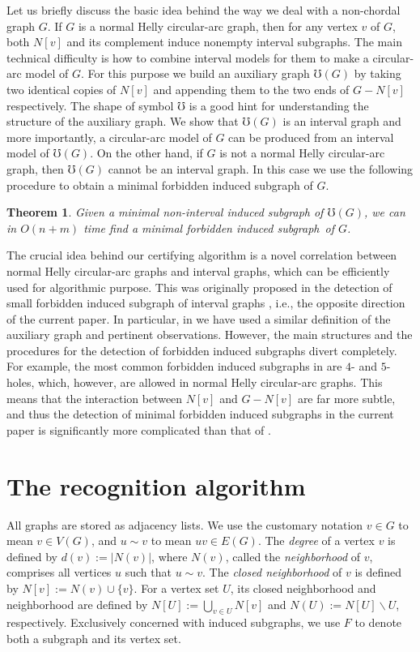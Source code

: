 \documentclass[10pt]{article}
\newtheorem{theorem}{Theorem}[section]
\newcommand{\badgraph}{minimal forbidden induced subgraph}
\newcommand{\nhcag}{normal Helly circular-arc graph}
\begin{document}
Let us briefly discuss the basic idea behind the way we deal with a
non-chordal graph $G$.  If $G$ is a \nhcag, then for any vertex $v$ of
$G$, both $N[v]$ and its complement induce nonempty interval
subgraphs.  The main technical difficulty is how to combine interval
models for them to make a circular-arc model of $G$.  For this purpose
we build an auxiliary graph $\mho(G)$ by taking two identical copies
of $N[v]$ and appending them to the two ends of $G - N[v]$
respectively.  {The shape of symbol $\mho$ is a good hint for
  understanding the structure of the auxiliary graph.} We show that
$\mho(G)$ is an interval graph and more importantly, a circular-arc
model of $G$ can be produced from an interval model of $\mho(G)$.  On
the other hand, if $G$ is not a \nhcag, then $\mho(G)$ cannot be an
interval graph.  In this case we use the following procedure to obtain
a minimal forbidden induced subgraph of $G$.
\begin{theorem}\label{thm:negative-certificate}
  Given a minimal non-interval induced subgraph of $\mho(G)$, we can
  in $O(n+m)$ time find a \badgraph\ of $G$.
\end{theorem}
The crucial idea behind our certifying algorithm is a novel
correlation between normal Helly circular-arc graphs and interval
graphs, which can be efficiently used for algorithmic purpose.  This
was originally proposed in the detection of small forbidden induced
subgraph of interval graphs \cite{cao-14-almost-interval-recognition},
i.e., the opposite direction of the current paper.  In particular, in
\cite{cao-14-almost-interval-recognition} we have used a similar
definition of the auxiliary graph and pertinent observations.
However, the main structures and the procedures for the detection of
forbidden induced subgraphs divert completely.  For example, the most
common forbidden induced subgraphs in
\cite{cao-14-almost-interval-recognition} are $4$- and $5$-holes,
which, however, are allowed in normal Helly circular-arc graphs.  This
means that the interaction between $N[v]$ and $G - N[v]$ are far more
subtle, and thus the detection of \badgraph s in the current paper is
significantly more complicated than that of
\cite{cao-14-almost-interval-recognition}.

\section{The recognition algorithm}\label{sec:recognition}
All graphs are stored as adjacency lists.  We use the customary
notation $v\in G$ to mean $v\in V(G)$, and $u\sim v$ to mean $uv\in
E(G)$.  The \emph{degree} of a vertex $v$ is defined by $d(v) :=
|N(v)|$, where $N(v)$, called the \emph{neighborhood} of $v$,
comprises all vertices $u$ such that $u\sim v$.  The \emph{closed
  neighborhood} of $v$ is defined by $N[v] := N(v) \cup \{v\}$.  For a
vertex set $U$, its closed neighborhood and neighborhood are defined
by $N[U] := \bigcup_{v \in U} N[v]$ and $N(U) := N[U] \backslash U$,
respectively.  Exclusively concerned with induced subgraphs, we use
$F$ to denote both a subgraph and its vertex set.
\end{document}
